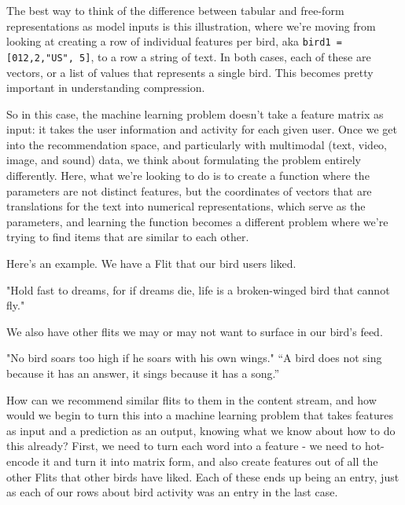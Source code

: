 \documentclass[11pt]{diazessay} %
\begin{document}
The best way to think of the difference between tabular and free-form representations as model inputs is this illustration, where we're moving from looking at creating a row of individual features per bird, aka \texttt{bird1 = [012,2,"US", 5]}, to a row a string of text. In both cases, each of these are vectors, or a list of values that represents a single bird. This becomes pretty important in understanding compression. 

So in this case, the machine learning problem doesn't take a feature matrix as input: it takes the user information and activity for each given user. Once we get into the recommendation space, and particularly with multimodal (text, video, image, and sound) data, we think about formulating the problem entirely differently. Here, what we're looking to do is to create a function where the parameters are not distinct features, but the coordinates of vectors that are translations for the text into numerical representations, which serve as the parameters, and learning the function\citep{castells2023recommender} becomes a different problem where we're trying to find items that are similar to each other. 

Here’s an example.  We have a Flit that our bird users liked. 

"Hold fast to dreams, for if dreams die, life is a broken-winged bird that cannot fly."

We also have other flits we may or may not want to surface in our bird's feed. 

"No bird soars too high if he soars with his own wings."
“A bird does not sing because it has an answer, it sings because it has a song.” 

How can we recommend similar flits to them in the content stream, and  how would we begin to turn this into a machine learning problem that takes features as input and a prediction as an output, knowing what we know about how to do this already?  First,  we need to turn each word into a feature - we need to hot-encode it and turn it into matrix form, and also create features out of all the other Flits that other birds have liked. Each of these ends up being an entry, just as each of our rows about bird activity was an entry in the last case.  
\end{document}
